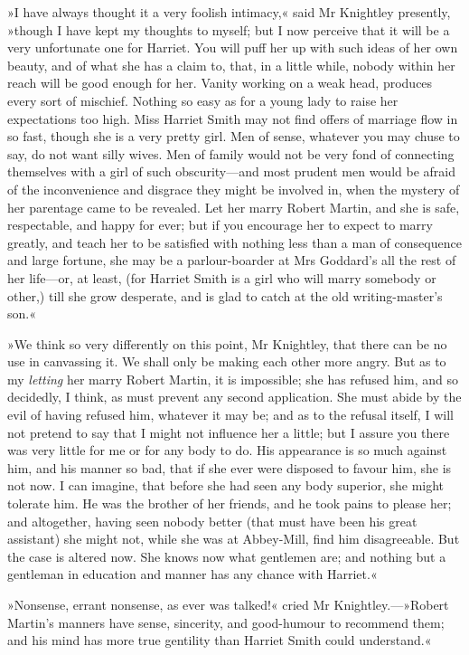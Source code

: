 »I have always thought it a very foolish intimacy,« said Mr Knightley presently, »though I have kept my thoughts to myself; but I now perceive that it will be a very unfortunate one for Harriet. You will puff her up with such ideas of her own beauty, and of what she has a claim to, that, in a little while, nobody within her reach will be good enough for her. Vanity working on a weak head, produces every sort of mischief. Nothing so easy as for a young lady to raise her expectations too high. Miss Harriet Smith may not find offers of marriage flow in so fast, though she is a very pretty girl. Men of sense, whatever you may chuse to say, do not want silly wives. Men of family would not be very fond of connecting themselves with a girl of such obscurity—and most prudent men would be afraid of the inconvenience and disgrace they might be involved in, when the mystery of her parentage came to be revealed. Let her marry Robert Martin, and she is safe, respectable, and happy for ever; but if you encourage her to expect to marry greatly, and teach her to be satisfied with nothing less than a man of consequence and large fortune, she may be a parlour-boarder at Mrs Goddard's all the rest of her life—or, at least, (for Harriet Smith is a girl who will marry somebody or other,) till she grow desperate, and is glad to catch at the old writing-master's son.«

»We think so very differently on this point, Mr Knightley, that there can be no use in canvassing it. We shall only be making each other more angry. But as to my \textit{letting} her marry Robert Martin, it is impossible; she has refused him, and so decidedly, I think, as must prevent any second application. She must abide by the evil of having refused him, whatever it may be; and as to the refusal itself, I will not pretend to say that I might not influence her a little; but I assure you there was very little for me or for any body to do. His appearance is so much against him, and his manner so bad, that if she ever were disposed to favour him, she is not now. I can imagine, that before she had seen any body superior, she might tolerate him. He was the brother of her friends, and he took pains to please her; and altogether, having seen nobody better (that must have been his great assistant) she might not, while she was at Abbey-Mill, find him disagreeable. But the case is altered now. She knows now what gentlemen are; and nothing but a gentleman in education and manner has any chance with Harriet.«

»Nonsense, errant nonsense, as ever was talked!« cried Mr Knightley.—»Robert Martin's manners have sense, sincerity, and good-humour to recommend them; and his mind has more true gentility than Harriet Smith could understand.«

